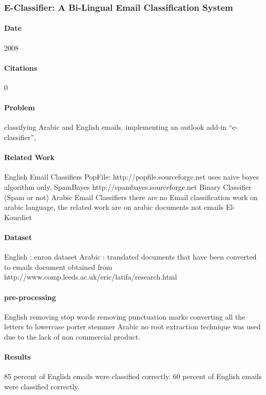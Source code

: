 \documentclass[12pt]{article}
\begin{document}
\subsubsection{E-Classifier: A Bi-Lingual Email Classification System}
\paragraph{Date} 2008
\paragraph{Citations} 0

\paragraph{Problem}
classifying Arabic and English emails.
implementing an outlook add-in “e-classifier”,

\paragraph{Related Work}
English Email Classifiers
PopFile:
http://popfile.sourceforge.net
uses naive bayes algorithm only.
SpamBayes
http://spambayes.sourceforge.net
Binary Classifier (Spam or not)
Arabic Email Classifiers
there are no Email classification work on arabic language, the related work are on arabic documents not emails
El-Kourdiet

\paragraph{Dataset}
English : enron dataset
Arabic :
translated documents that have been converted to emails
document obtained from
http://www.comp.leeds.ac.uk/eric/latifa/research.html

\paragraph{pre-processing}
English
removing stop words
removing punctuation marks
converting all the letters to lowercase
porter stemmer
Arabic
no root extraction technique was used due to the lack of non commercial product.

\paragraph{Results}
85 percent of English emails were classified correctly.
60 percent of English emails were classified correctly.
\end{document}
